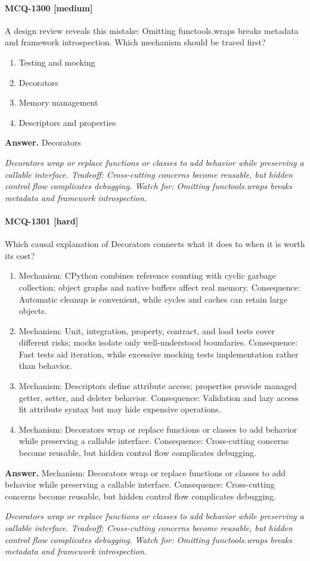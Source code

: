 \paragraph{MCQ-1300 [medium]} A design review reveals this mistake: Omitting functools.wraps breaks metadata and framework introspection. Which mechanism should be traced first?
\begin{enumerate}[label=\Alph*.]
\item Testing and mocking
\item Decorators
\item Memory management
\item Descriptors and properties
\end{enumerate}
\noindent\textbf{Answer.} Decorators
\par\textit{Decorators wrap or replace functions or classes to add behavior while preserving a callable interface. Tradeoff: Cross-cutting concerns become reusable, but hidden control flow complicates debugging. Watch for: Omitting functools.wraps breaks metadata and framework introspection.}
\paragraph{MCQ-1301 [hard]} Which causal explanation of Decorators connects what it does to when it is worth its cost?
\begin{enumerate}[label=\Alph*.]
\item Mechanism: CPython combines reference counting with cyclic garbage collection; object graphs and native buffers affect real memory. Consequence: Automatic cleanup is convenient, while cycles and caches can retain large objects.
\item Mechanism: Unit, integration, property, contract, and load tests cover different risks; mocks isolate only well-understood boundaries. Consequence: Fast tests aid iteration, while excessive mocking tests implementation rather than behavior.
\item Mechanism: Descriptors define attribute access; properties provide managed getter, setter, and deleter behavior. Consequence: Validation and lazy access fit attribute syntax but may hide expensive operations.
\item Mechanism: Decorators wrap or replace functions or classes to add behavior while preserving a callable interface. Consequence: Cross-cutting concerns become reusable, but hidden control flow complicates debugging.
\end{enumerate}
\noindent\textbf{Answer.} Mechanism: Decorators wrap or replace functions or classes to add behavior while preserving a callable interface. Consequence: Cross-cutting concerns become reusable, but hidden control flow complicates debugging.
\par\textit{Decorators wrap or replace functions or classes to add behavior while preserving a callable interface. Tradeoff: Cross-cutting concerns become reusable, but hidden control flow complicates debugging. Watch for: Omitting functools.wraps breaks metadata and framework introspection.}
